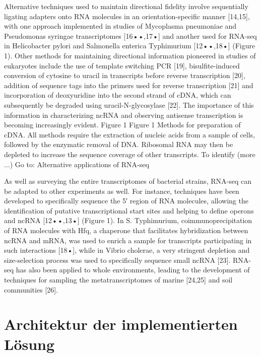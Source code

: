 \documentclass[a4paper]{thesis}
\begin{document}
Alternative techniques used to maintain directional fidelity involve sequentially ligating adapters onto RNA molecules in an orientation-specific manner [14,15], with one approach implemented in studies of Mycoplasma pneumoniae and Pseudomonas syringae transcriptomes [16••,17•] and another used for RNA-seq in Helicobacter pylori and Salmonella enterica Typhimurium [12••,18•] (Figure 1). Other methods for maintaining directional information pioneered in studies of eukaryotes include the use of template switching PCR [19], bisulfite-induced conversion of cytosine to uracil in transcripts before reverse transcription [20], addition of sequence tags into the primers used for reverse transcription [21] and incorporation of deoxyuridine into the second strand of cDNA, which can subsequently be degraded using uracil-N-glycosylase [22]. The importance of this information in characterizing ncRNA and observing antisense transcription is becoming increasingly evident.
Figure 1
Figure 1
Methods for preparation of cDNA. All methods require the extraction of nucleic acids from a sample of cells, followed by the enzymatic removal of DNA. Ribosomal RNA may then be depleted to increase the sequence coverage of other transcripts. To identify (more ...)
Go to:
Alternative applications of RNA-seq

As well as surveying the entire transcriptomes of bacterial strains, RNA-seq can be adapted to other experiments as well. For instance, techniques have been developed to specifically sequence the 5′ region of RNA molecules, allowing the identification of putative transcriptional start sites and helping to define operons and ncRNA [12••,13•] (Figure 1). In S. Typhimurium, coimmunoprecipitation of RNA molecules with Hfq, a chaperone that facilitates hybridization between ncRNA and mRNA, was used to enrich a sample for transcripts participating in such interactions [18•], while in Vibrio cholerae, a very stringent depletion and size-selection process was used to specifically sequence small ncRNA [23]. RNA-seq has also been applied to whole environments, leading to the development of techniques for sampling the metatranscriptomes of marine [24,25] and soil communities [26].

\fi

\section{Architektur der implementierten Lösung}
\end{document}
